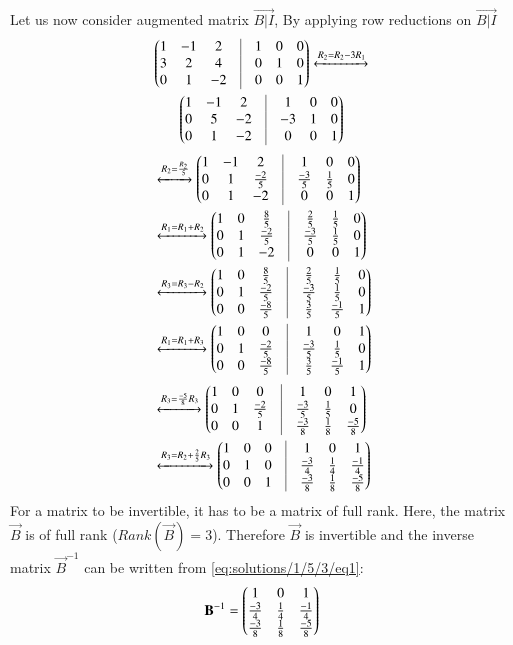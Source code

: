 Let us now consider augmented matrix $\vec{B|I}$, By applying row reductions on $\vec{B|I}$
\begin{multline}
\myvec{1&-1&2&\vrule&1&0&0\\3&2&4&\vrule&0&1&0\\0&1&-2&\vrule&0&0&1}
\xleftrightarrow{R_2=R_2-3R_1}\\
\myvec{1&-1&2&\vrule&1&0&0\\0&5&-2&\vrule&-3&1&0\\0&1&-2&\vrule&0&0&1}
\end{multline}
\begin{align}
&\xleftrightarrow{R_2=\frac{R_2}{5}}\myvec{1&-1&2&\vrule&1&0&0\\0&1&\frac{-2}{5}&\vrule&\frac{-3}{5}&\frac{1}{5}&0\\0&1&-2&\vrule&0&0&1}\\
&\xleftrightarrow{R_1=R_1+R_2}\myvec{1&0&\frac{8}{5}&\vrule&\frac{2}{5}&\frac{1}{5}&0\\0&1&\frac{-2}{5}&\vrule&\frac{-3}{5}&\frac{1}{5}&0\\0&1&-2&\vrule&0&0&1}\\
&\xleftrightarrow{R_3=R_3-R_2}\myvec{1&0&\frac{8}{5}&\vrule&\frac{2}{5}&\frac{1}{5}&0\\0&1&\frac{-2}{5}&\vrule&\frac{-3}{5}&\frac{1}{5}&0\\0&0&\frac{-8}{5}&\vrule&\frac{3}{5}&\frac{-1}{5}&1}\\
&\xleftrightarrow{R_1=R_1+R_3}\myvec{1&0&0&\vrule&1&0&1\\0&1&\frac{-2}{5}&\vrule&\frac{-3}{5}&\frac{1}{5}&0\\0&0&\frac{-8}{5}&\vrule&\frac{3}{5}&\frac{-1}{5}&1}
\end{align}
\begin{align}
&\xleftrightarrow{R_3=\frac{-5}{8}R_3}\myvec{1&0&0&\vrule&1&0&1\\0&1&\frac{-2}{5}&\vrule&\frac{-3}{5}&\frac{1}{5}&0\\0&0&1&\vrule&\frac{-3}{8}&\frac{1}{8}&\frac{-5}{8}}\\
&\xleftrightarrow{R_3=R_2+\frac{2}{5}R_3}\myvec{1&0&0&\vrule&1&0&1\\0&1&0&\vrule&\frac{-3}{4}&\frac{1}{4}&\frac{-1}{4}\\0&0&1&\vrule&\frac{-3}{8}&\frac{1}{8}&\frac{-5}{8}}\label{eq:solutions/1/5/3/eq1}
\end{align}
For a matrix to be invertible, it has to be a matrix of full rank. Here, the matrix $\vec{B}$ is of full rank ($Rank(\vec{B})=3$). Therefore $\vec{B}$ is invertible and the inverse matrix $\vec{B}^{-1}$ can be written from \eqref{eq:solutions/1/5/3/eq1}:
\begin{align}
\mathbf{B}^{-1}=\begin{pmatrix}1&0&1\\\frac{-3}{4}&\frac{1}{4}&\frac{-1}{4}\\\frac{-3}{8}&\frac{1}{8}&\frac{-5}{8}\end{pmatrix}  
\end{align}
